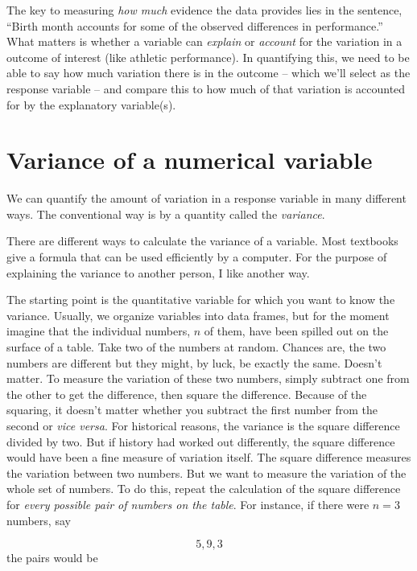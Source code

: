 \documentclass[]{book}
\begin{document}
The key to measuring \emph{how much} evidence the data provides lies in the sentence, ``Birth month accounts for some of the observed differences in performance.'' What matters is whether a variable can \emph{explain} or \emph{account} for the variation in a outcome of interest (like athletic performance). In quantifying this, we need to be able to say how much variation there is in the outcome -- which we'll select as the response variable -- and compare this to how much of that variation is accounted for by the explanatory variable(s).

\hypertarget{variance-of-a-numerical-variable}{%
\section{Variance of a numerical variable}\label{variance-of-a-numerical-variable}}

We can quantify the amount of variation in a response variable in many different ways. The conventional way is by a quantity called the \emph{variance}.

There are different ways to calculate the variance of a variable. Most textbooks give a formula that can be used efficiently by a computer. For the purpose of explaining the variance to another person, I like another way.

The starting point is the quantitative variable for which you want to know the variance. Usually, we organize variables into data frames, but for the moment imagine that the individual numbers, \(n\) of them, have been spilled out on the surface of a table. Take two of the numbers at random. Chances are, the two numbers are different but they might, by luck, be exactly the same. Doesn't matter. To measure the variation of these two numbers, simply subtract one from the other to get the difference, then square the difference. Because of the squaring, it doesn't matter whether you subtract the first number from the second or \emph{vice versa}. For historical reasons, the variance is the square difference divided by two. But if history had worked out differently, the square difference would have been a fine measure of variation itself.
The square difference measures the variation between two numbers. But we want to measure the variation of the whole set of numbers. To do this, repeat the calculation of the square difference for \emph{every possible pair of numbers on the table}. For instance, if there were \(n=3\) numbers, say

\[5, 9,  3\]
the pairs would be
\end{document}
